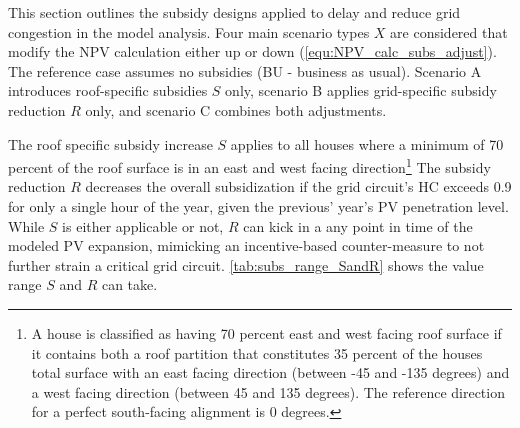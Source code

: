 \documentclass[12PT, ]{article}
\begin{document}
This section outlines the subsidy designs applied to delay and reduce grid congestion in the model analysis. 
%
Four main scenario types $X$ are considered that modify the NPV calculation either up or down (\ref{equ:NPV_calc_subs_adjust}). The reference case assumes no subsidies (BU - business as usual). Scenario A introduces roof-specific subsidies $S$ only, scenario B applies grid-specific subsidy reduction $R$ only, and scenario C combines both adjustments. 

The roof specific subsidy increase $S$ applies to all houses where a minimum of 70 percent of the roof surface is in an east and west facing direction\footnote{A house is classified as having 70 percent east and west facing roof surface if it contains both a roof partition that constitutes 35 percent of the houses total surface with an east facing direction (between -45 and -135 degrees) and a west facing direction (between 45 and 135 degrees). The reference direction for a perfect south-facing alignment is 0 degrees.}
The subsidy reduction $R$ decreases the overall subsidization if the grid circuit's HC exceeds 0.9 for only a single hour of the year, given the previous' year's PV penetration level. 
%
While $S$ is either applicable or not, $R$ can kick in a any point in time of the modeled PV expansion, mimicking an incentive-based counter-measure to not further strain a critical grid circuit.
\ref{tab:subs_range_SandR} shows the value range $S$ and $R$ can take.
%
\vspace{0.2cm}
\end{document}
